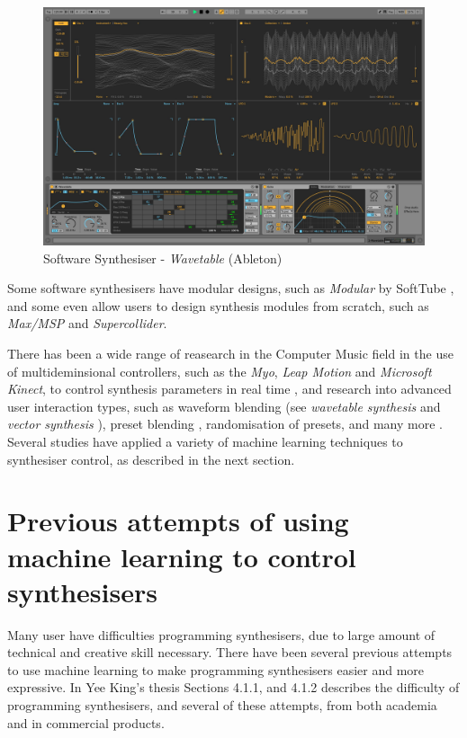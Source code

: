 \documentclass[11pt, oneside]{report}   	%
\begin{document}
\begin{figure}[h] 
	\centering
	\includegraphics[width = 5in]{AbletonWavetable.jpg}
	\caption{Software Synthesiser - \emph{Wavetable} (Ableton)\cite{Wavetable} }
	\label{fig:AbletonWavetable}
\end{figure}

Some software synthesisers have modular designs, such as \emph{Modular} by SoftTube \cite{SoftTube}, and some even allow users to design synthesis modules from scratch, such as \emph{Max/MSP} and \emph{Supercollider}.

There has been a wide range of reasearch in the Computer Music field in the use of multideminsional controllers, such as the  \emph{Myo}, \emph{Leap Motion} and \emph{Microsoft Kinect}, to control synthesis parameters in real time \cite{ICMC, TubbThesis}, and research into advanced user interaction types, such as waveform blending (see \emph{wavetable synthesis}\cite{Wavetable} and \emph{vector synthesis} \cite{SY22}), preset blending \cite{Interpolation}, randomisation of presets, and many more \cite{YeeKing, EvolvedAudioEffects}.  Several studies have applied a variety of machine learning techniques to synthesiser control, as described in the next section.

\section{Previous attempts of using machine learning to control synthesisers}
Many user have difficulties programming synthesisers, due to large amount of technical and creative skill necessary. There have been several previous attempts to use machine learning to make programming synthesisers easier and more expressive. In Yee King's thesis \cite{YeeKing} Sections 4.1.1, and 4.1.2 describes the difficulty of programming synthesisers, and several of these attempts, from both academia and in commercial products.
\end{document}
